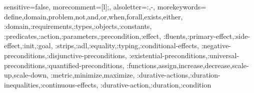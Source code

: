 {
  sensitive=false,    %
  morecomment=[l]{;}, %
  alsoletter={:,-},   %
  morekeywords={
    define,domain,problem,not,and,or,when,forall,exists,either,
    :domain,:requirements,:types,:objects,:constants,
    :predicates,:action,:parameters,:precondition,:effect,
    :fluents,:primary-effect,:side-effect,:init,:goal,
    :strips,:adl,:equality,:typing,:conditional-effects,
    :negative-preconditions,:disjunctive-preconditions,
    :existential-preconditions,:universal-preconditions,:quantified-preconditions,
    :functions,assign,increase,decrease,scale-up,scale-down,
    :metric,minimize,maximize,
    :durative-actions,:duration-inequalities,:continuous-effects,
    :durative-action,:duration,:condition
  }
}